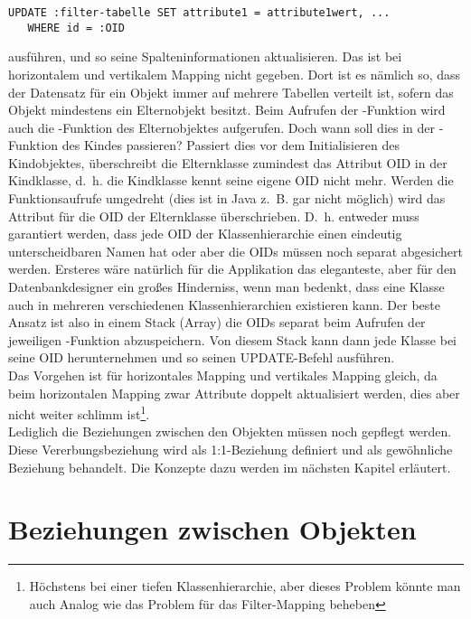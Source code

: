 \lstset{style=SQL}
\begin{lstlisting}
UPDATE :filter-tabelle SET attribute1 = attribute1wert, ... 
   WHERE id = :OID
\end{lstlisting}
\noindent ausführen, und so seine Spalteninformationen aktualisieren. Das ist bei horizontalem und vertikalem Mapping nicht gegeben. Dort ist es nämlich so, dass der Datensatz für ein Objekt immer auf mehrere Tabellen verteilt ist, sofern das Objekt mindestens ein Elternobjekt besitzt. Beim Aufrufen der -Funktion wird auch die -Funktion des Elternobjektes aufgerufen. Doch wann soll dies in der -Funktion des Kindes passieren? Passiert dies vor dem Initialisieren des Kindobjektes, überschreibt die Elternklasse zumindest das Attribut OID in der Kindklasse, d.~h. die Kindklasse kennt seine eigene OID nicht mehr. Werden die Funktionsaufrufe umgedreht (dies ist in Java z.~B. gar nicht möglich) wird das Attribut für die OID der Elternklasse überschrieben. D.~h. entweder muss garantiert werden, dass jede OID der Klassenhierarchie einen eindeutig unterscheidbaren Namen hat oder aber die OIDs müssen noch separat abgesichert werden. Ersteres wäre natürlich für die Applikation das eleganteste, aber für den Datenbankdesigner ein großes Hinderniss, wenn man bedenkt, dass eine Klasse auch in mehreren verschiedenen Klassenhierarchien existieren kann. Der beste Ansatz ist also in einem Stack (Array) die OIDs separat beim Aufrufen der jeweiligen -Funktion abzuspeichern. Von diesem Stack kann dann jede Klasse bei  seine OID herunternehmen und so seinen UPDATE-Befehl ausführen. \\
Das Vorgehen ist für horizontales Mapping und vertikales Mapping  gleich, da beim horizontalen Mapping zwar Attribute doppelt aktualisiert werden, dies aber nicht weiter schlimm ist\footnote{Höchstens bei einer tiefen Klassenhierarchie, aber dieses Problem könnte man auch Analog wie das Problem für das Filter-Mapping beheben}. \\
Lediglich die Beziehungen zwischen den Objekten müssen noch gepflegt werden. Diese Vererbungsbeziehung wird als 1:1-Beziehung definiert und als gewöhnliche Beziehung behandelt. Die Konzepte dazu werden im nächsten Kapitel erläutert. \\

\section{Beziehungen zwischen Objekten}

